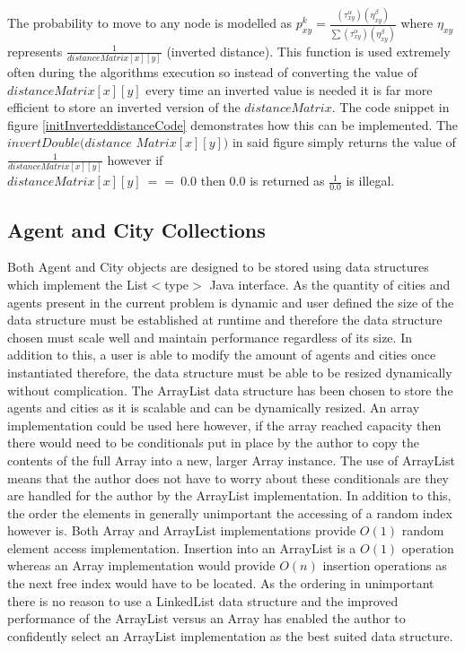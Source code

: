 The probability to move to any node is modelled as $p_{xy}^{k} = \frac{(\tau_{xy}^{\alpha })(\eta _{xy}^{\beta })}{\sum (\tau_{xy}^{\alpha })(\eta _{xy}^{\beta })}$ where $\eta _{xy}$ represents $\frac{1}{distanceMatrix[x][y]}$ (inverted distance). This function is used extremely often during the algorithms execution so instead of converting the value of $distanceMatrix[x][y]$ every time an inverted value is needed it is far more efficient to store an inverted version of the $distanceMatrix$. The code snippet in figure \ref{initInverteddistanceCode} demonstrates how this can be implemented. The $invertDouble(distance$ $Matrix[x][y])$ in said figure simply returns the value of $\frac{1}{distanceMatrix[x][y]}$ however if \\ $distanceMatrix[x][y]\ ==\ 0.0$ then $0.0$ is returned as $\frac{1}{0.0}$ is illegal.
  
\subsection{Agent and City Collections}

Both Agent and City objects are designed to be stored using data structures which implement the List$<$type$>$ Java interface. As the quantity of cities and agents present in the current problem is dynamic and user defined the size of the data structure must be established at runtime and therefore the data structure chosen must scale well and maintain performance regardless of its size. In addition to this, a user is able to modify the amount of agents and cities once instantiated therefore, the data structure must be able to be  resized dynamically without complication. The ArrayList data structure has been chosen to store the agents and cities as it is scalable and can be dynamically resized. An array implementation could be used here however, if the array reached capacity then there would need to be conditionals put in place by the author to copy the contents of the full Array into a new, larger Array instance. The use of ArrayList means that the author does not have to worry about these conditionals are they are handled for the author by the ArrayList implementation. In addition to this, the order the elements in generally unimportant the accessing of a random index however is. Both Array and ArrayList implementations provide $O(1)$ random element access implementation. Insertion into an ArrayList is a $O(1)$ operation whereas an Array implementation would provide $O(n)$ insertion operations as the next free index would have to be located. As the ordering in unimportant there is no reason to use a LinkedList data structure and the improved performance of the ArrayList versus an Array has enabled the author to confidently select an ArrayList implementation as the best suited data structure. 

